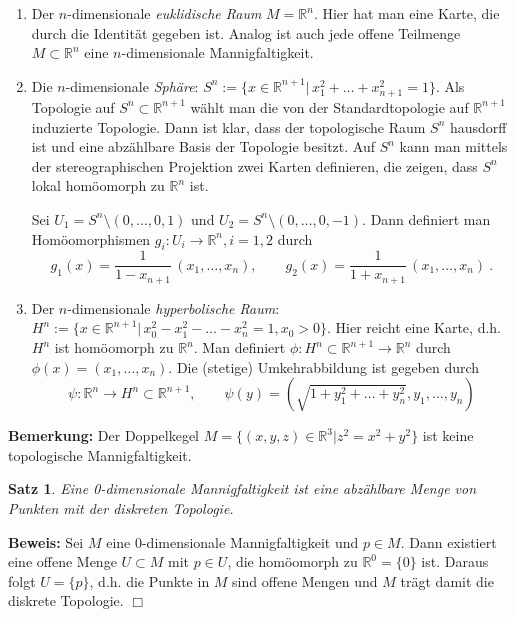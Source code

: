 \documentclass[12pt,a4paper]{article}
\def\R{\mathbb{R}}
\newtheorem{Satz}[Lemma]{Satz}
\def\proof{\noindent\textbf{Beweis:}\quad}
\def\qed{\quad\hfill\ensuremath{\Box}}
\begin{document}
\begin{enumerate}
\item Der $n$-dimensionale {\it euklidische Raum} $M=\R^n$. Hier hat man eine Karte, die durch die Identit\"at
gegeben ist. Analog ist auch jede offene Teilmenge $M\subset \R^n$ eine $n$-dimensionale Mannigfaltigkeit.

\item Die $n$-dimensionale {\it Sph\"are}: $S^n := \{x\in \R^{n+1} | \, x_1^2 + \ldots + x_{n+1}^2 = 1\}$. Als Topologie
auf $S^n \subset \R^{n+1}$ w\"ahlt man die von der Standardtopologie auf $\R^{n+1}$ induzierte Topologie. Dann ist klar,
dass der topologische Raum $S^n$ hausdorff ist und eine abz\"ahlbare Basis der Topologie besitzt. Auf $S^n$ kann
man mittels der stereographischen Projektion zwei Karten definieren, die zeigen, dass $S^n$ lokal hom\"oomorph
zu $\R^n$ ist.

Sei $U_1 = S^n \setminus (0,\ldots,0,1)$ und $U_2 = S^n \setminus (0,\ldots,0,-1)$. Dann definiert man
Hom\"oomorphismen $g_i: U_i \rightarrow \R^n, i = 1,2$ durch
$$
g_1(x) = \frac{1}{1-x_{n+1}}\,(x_1,\ldots, x_n), \qquad g_2(x) = \frac{1}{1+x_{n+1}}\,(x_1,\ldots, x_n) \ .
$$

\item Der $n$-dimensionale {\it hyperbolische Raum}: $H^n :=\{ x \in \R^{n+1} |\, x_0^2 -x_1^2 -
\ldots - x_n^2 = 1, x_0 >0\}$. Hier reicht eine Karte, d.h. $H^n$ ist hom\"oomorph zu $\R^n$. Man definiert
$\phi : H^n \subset \R^{n+1}\rightarrow \R^n$ durch $\phi(x) = (x_1,\ldots, x_n)$. Die (stetige)
Umkehrabbildung ist gegeben durch
$$
\psi : \R^n \rightarrow H^n \subset \R^{n+1}, \qquad \psi(y) = (\sqrt{1+y_1^2 + \ldots + y_n^2},y_1, \ldots , y_n)
$$
\end{enumerate}

\bigskip

{\bf Bemerkung:} Der Doppelkegel $M = \{(x,y,z) \in \R^3 | z^2 = x^2 + y^2\}$ ist keine topologische
Mannigfaltigkeit.

\bigskip

\begin{Satz}
Eine 0-dimensionale Mannigfaltigkeit ist eine abz\"ahlbare Menge von Punkten mit der diskreten Topologie.
\end{Satz}
\proof
Sei $M$ eine 0-dimensionale Mannigfaltigkeit und $p\in M$. Dann existiert eine offene Menge $U\subset M$ mit
$p\in U$, die hom\"oomorph zu $\R^0= \{0\}$ ist. Daraus folgt $U = \{p\}$, d.h. die Punkte in $M$ sind
offene Mengen und $M$ tr\"agt damit die diskrete Topologie.
\qed
\end{document}
